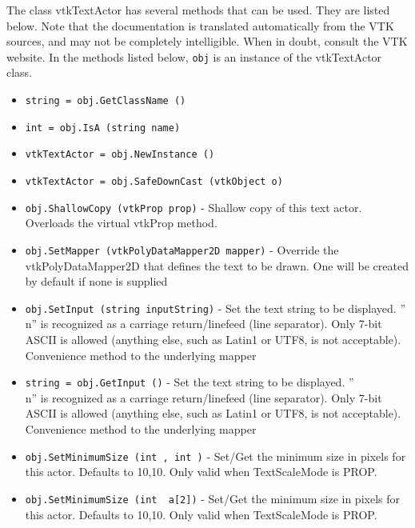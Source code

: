 The class vtkTextActor has several methods that can be used.
  They are listed below.
Note that the documentation is translated automatically from the VTK sources,
and may not be completely intelligible.  When in doubt, consult the VTK website.
In the methods listed below, \verb|obj| is an instance of the vtkTextActor class.
\begin{itemize}
\item  \verb|string = obj.GetClassName ()|

\item  \verb|int = obj.IsA (string name)|

\item  \verb|vtkTextActor = obj.NewInstance ()|

\item  \verb|vtkTextActor = obj.SafeDownCast (vtkObject o)|

\item  \verb|obj.ShallowCopy (vtkProp prop)| -  Shallow copy of this text actor. Overloads the virtual
 vtkProp method.

\item  \verb|obj.SetMapper (vtkPolyDataMapper2D mapper)| -  Override the vtkPolyDataMapper2D that defines the text to be drawn.
 One will be created by default if none is supplied

\item  \verb|obj.SetInput (string inputString)| -  Set the text string to be displayed. ''\\n'' is recognized
 as a carriage return/linefeed (line separator). Only 7-bit ASCII is
 allowed (anything else, such as Latin1 or UTF8, is not acceptable).
 Convenience method to the underlying mapper

\item  \verb|string = obj.GetInput ()| -  Set the text string to be displayed. ''\\n'' is recognized
 as a carriage return/linefeed (line separator). Only 7-bit ASCII is
 allowed (anything else, such as Latin1 or UTF8, is not acceptable).
 Convenience method to the underlying mapper

\item  \verb|obj.SetMinimumSize (int , int )| -  Set/Get the minimum size in pixels for this actor.
 Defaults to 10,10.
 Only valid when TextScaleMode is PROP.

\item  \verb|obj.SetMinimumSize (int  a[2])| -  Set/Get the minimum size in pixels for this actor.
 Defaults to 10,10.
 Only valid when TextScaleMode is PROP.


\end{itemize}
